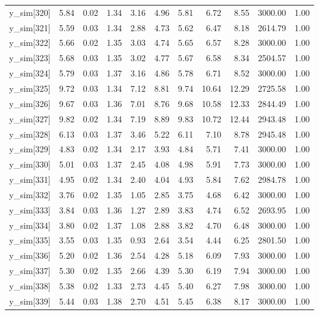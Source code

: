 \begin{table}[ht]
\begin{tabular}{rrrrrrrrrrr}
  y\_sim[320] & 5.84 & 0.02 & 1.34 & 3.16 & 4.96 & 5.81 & 6.72 & 8.55 & 3000.00 & 1.00 \\ 
  y\_sim[321] & 5.59 & 0.03 & 1.34 & 2.88 & 4.73 & 5.62 & 6.47 & 8.18 & 2614.79 & 1.00 \\ 
  y\_sim[322] & 5.66 & 0.02 & 1.35 & 3.03 & 4.74 & 5.65 & 6.57 & 8.28 & 3000.00 & 1.00 \\ 
  y\_sim[323] & 5.68 & 0.03 & 1.35 & 3.02 & 4.77 & 5.67 & 6.58 & 8.34 & 2504.57 & 1.00 \\ 
  y\_sim[324] & 5.79 & 0.03 & 1.37 & 3.16 & 4.86 & 5.78 & 6.71 & 8.52 & 3000.00 & 1.00 \\ 
  y\_sim[325] & 9.72 & 0.03 & 1.34 & 7.12 & 8.81 & 9.74 & 10.64 & 12.29 & 2725.58 & 1.00 \\ 
  y\_sim[326] & 9.67 & 0.03 & 1.36 & 7.01 & 8.76 & 9.68 & 10.58 & 12.33 & 2844.49 & 1.00 \\ 
  y\_sim[327] & 9.82 & 0.02 & 1.34 & 7.19 & 8.89 & 9.83 & 10.72 & 12.44 & 2943.48 & 1.00 \\ 
  y\_sim[328] & 6.13 & 0.03 & 1.37 & 3.46 & 5.22 & 6.11 & 7.10 & 8.78 & 2945.48 & 1.00 \\ 
  y\_sim[329] & 4.83 & 0.02 & 1.34 & 2.17 & 3.93 & 4.84 & 5.71 & 7.41 & 3000.00 & 1.00 \\ 
  y\_sim[330] & 5.01 & 0.03 & 1.37 & 2.45 & 4.08 & 4.98 & 5.91 & 7.73 & 3000.00 & 1.00 \\ 
  y\_sim[331] & 4.95 & 0.02 & 1.34 & 2.40 & 4.04 & 4.93 & 5.84 & 7.62 & 2984.78 & 1.00 \\ 
  y\_sim[332] & 3.76 & 0.02 & 1.35 & 1.05 & 2.85 & 3.75 & 4.68 & 6.42 & 3000.00 & 1.00 \\ 
  y\_sim[333] & 3.84 & 0.03 & 1.36 & 1.27 & 2.89 & 3.83 & 4.74 & 6.52 & 2693.95 & 1.00 \\ 
  y\_sim[334] & 3.80 & 0.02 & 1.37 & 1.08 & 2.88 & 3.82 & 4.70 & 6.48 & 3000.00 & 1.00 \\ 
  y\_sim[335] & 3.55 & 0.03 & 1.35 & 0.93 & 2.64 & 3.54 & 4.44 & 6.25 & 2801.50 & 1.00 \\ 
  y\_sim[336] & 5.20 & 0.02 & 1.36 & 2.54 & 4.28 & 5.18 & 6.09 & 7.93 & 3000.00 & 1.00 \\ 
  y\_sim[337] & 5.30 & 0.02 & 1.35 & 2.66 & 4.39 & 5.30 & 6.19 & 7.94 & 3000.00 & 1.00 \\ 
  y\_sim[338] & 5.38 & 0.02 & 1.33 & 2.73 & 4.45 & 5.40 & 6.27 & 7.98 & 3000.00 & 1.00 \\ 
  y\_sim[339] & 5.44 & 0.03 & 1.38 & 2.70 & 4.51 & 5.45 & 6.38 & 8.17 & 3000.00 & 1.00 \\ 

\end{tabular}
\end{table}
